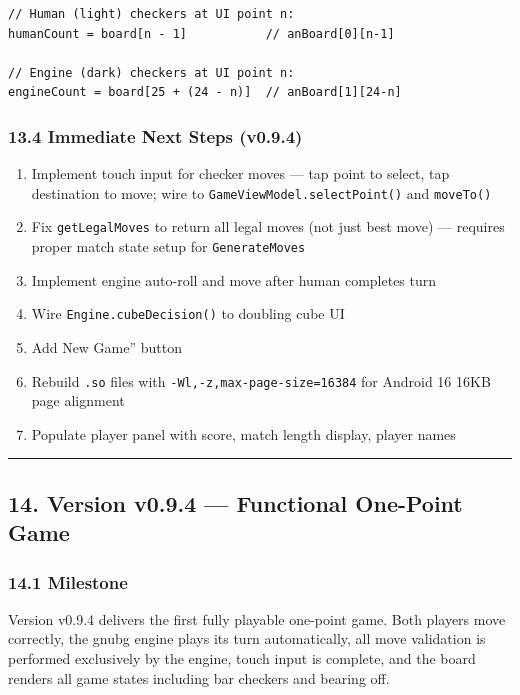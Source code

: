 \documentclass[11pt,a4paper]{article}
\providecommand{\tightlist}{\setlength{\itemsep}{2pt}\setlength{\parskip}{0pt}}
\begin{document}
\begin{verbatim}
// Human (light) checkers at UI point n:
humanCount = board[n - 1]           // anBoard[0][n-1]

// Engine (dark) checkers at UI point n:
engineCount = board[25 + (24 - n)]  // anBoard[1][24-n]
\end{verbatim}

\subsubsection{13.4 Immediate Next Steps
(v0.9.4)}\label{immediate-next-steps-v094}

\begin{enumerate}
\def\labelenumi{\arabic{enumi}.}
\tightlist
\item
  Implement touch input for checker moves --- tap point to select, tap
  destination to move; wire to \texttt{GameViewModel.selectPoint()} and
  \texttt{moveTo()}
\item
  Fix \texttt{getLegalMoves} to return all legal moves (not just best
  move) --- requires proper match state setup for
  \texttt{GenerateMoves}
\item
  Implement engine auto-roll and move after human completes turn
\item
  Wire \texttt{Engine.cubeDecision()} to doubling cube UI
\item
  Add New Game'' button
\item
  Rebuild \texttt{.so} files with \texttt{-Wl,-z,max-page-size=16384}
  for Android 16 16KB page alignment
\item
  Populate player panel with score, match length display, player names
\end{enumerate}

\begin{center}\rule{0.5\linewidth}{0.5pt}\end{center}

\subsection{14. Version v0.9.4 --- Functional One-Point
Game}\label{version-v094-functional-one-point-game}

\subsubsection{14.1 Milestone}\label{milestone-v094}

Version v0.9.4 delivers the first fully playable one-point game. Both
players move correctly, the gnubg engine plays its turn automatically,
all move validation is performed exclusively by the engine, touch input
is complete, and the board renders all game states including bar
checkers and bearing off.
\end{document}
